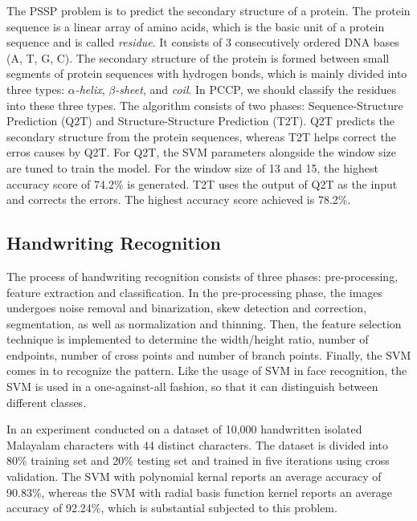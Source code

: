 The PSSP problem is to predict the secondary structure of a protein. The
protein sequence is a linear array of amino acids, which is the basic unit
of a protein sequence and is called \emph{residue}.
It consists of 3 consecutively ordered DNA bases (A, T, G, C). 
The secondary structure of the protein is formed between small segments of 
protein sequences with hydrogen bonds, which is mainly divided into 
three types: \emph{$\alpha$-helix}, \emph{$\beta$-sheet}, and \emph{coil}. 
In PCCP, we should classify the residues into these three types.
The algorithm consists of two phases: Sequence-Structure Prediction (Q2T) and
Structure-Structure Prediction (T2T). Q2T predicts the secondary structure
from the protein sequences, whereas T2T helps correct the erros
causes by Q2T. For Q2T, the SVM parameters alongside the window size are tuned
to train the model. For the window size of 13 and 15, the highest accuracy score
of 74.2\% is generated. T2T uses the output of Q2T as the input and corrects
the errors. The highest accuracy score achieved is 78.2\%.
\cite{bioinformatics}

\subsection*{Handwriting Recognition}
The process of handwriting recognition consists of three phases:
pre-processing, feature extraction and classification. In the pre-processing
phase, the images undergoes noise removal and binarization, skew detection
and correction, segmentation, as well as normalization and thinning. Then, 
the feature selection technique is implemented to determine the width/height
ratio, number of endpoints, number of cross points and number of branch
points. Finally, the SVM comes in to recognize the pattern. Like the usage of
SVM in face recognition, the SVM is used in a one-against-all fashion, so that
it can distinguish between different classes.

In an experiment conducted on a dataset of 10,000 handwritten isolated
Malayalam characters with 44 distinct characters. The dataset is divided
into 80\% training set and 20\% testing set and trained in five iterations
using cross validation. The SVM with polynomial kernal reports an average
accuracy of 90.83\%, whereas the SVM with radial basis function kernel
reports an average accuracy of 92.24\%, which is substantial subjected to 
this problem.
\cite{handwriting-recognition}
